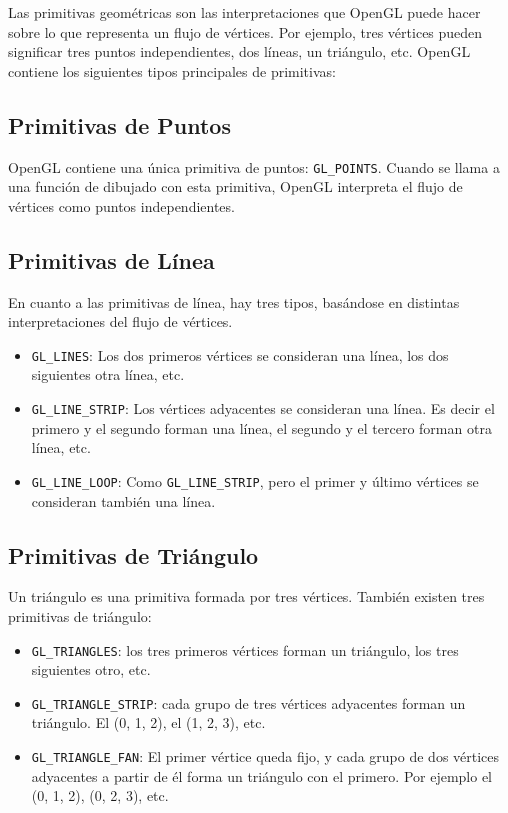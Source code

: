 Las primitivas geométricas son las interpretaciones que OpenGL puede
hacer sobre lo que representa un flujo de vértices. Por ejemplo, tres vértices
pueden significar tres puntos independientes, dos líneas, un triángulo, etc.
OpenGL contiene los siguientes tipos principales de primitivas:

\subsection{Primitivas de Puntos}
\label{ref:points}

OpenGL contiene una única primitiva de puntos: \verb|GL_POINTS|. Cuando se llama
a una función de dibujado con esta primitiva, OpenGL interpreta el flujo de
vértices como puntos independientes.

\subsection{Primitivas de Línea}
\label{ref:lines}

En cuanto a las primitivas de línea, hay tres tipos, basándose en distintas
interpretaciones del flujo de vértices.

\begin{itemize}
		\item \verb|GL_LINES|: Los dos primeros vértices se consideran una línea,
				los dos siguientes otra línea, etc.
		\item \verb|GL_LINE_STRIP|: Los vértices adyacentes se consideran una
			línea. Es decir el primero y el segundo forman una línea, el segundo
			y el tercero forman otra línea, etc.
		\item \verb|GL_LINE_LOOP|: Como \verb|GL_LINE_STRIP|, pero el primer y
				último vértices se consideran también una línea.
\end{itemize}

\subsection{Primitivas de Triángulo}
\label{ref:triangles}

Un triángulo es una primitiva formada por tres vértices. También existen tres
primitivas de triángulo:

\begin{itemize}
		\item \verb|GL_TRIANGLES|: los tres primeros vértices forman un
				triángulo, los tres siguientes otro, etc.
		\item \verb|GL_TRIANGLE_STRIP|: cada grupo de tres vértices adyacentes
				forman un triángulo. El (0, 1, 2), el (1, 2, 3), etc.
		\item \verb|GL_TRIANGLE_FAN|: El primer vértice queda fijo, y cada grupo
				de dos vértices adyacentes a partir de él forma un triángulo con
				el primero. Por ejemplo el (0, 1, 2), (0, 2, 3), etc.
\end{itemize}

